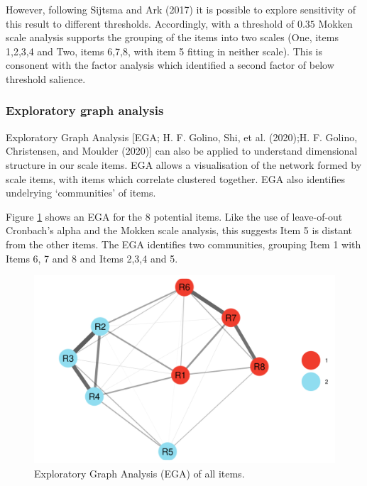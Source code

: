 \documentclass[
  ,jou,floatsintext]{apa6}
\begin{document}
However, following Sijtsma and Ark (2017) it is possible to explore sensitivity of this result to different thresholds. Accordingly, with a threshold of \(0.35\) Mokken scale analysis supports the grouping of the items into two scales (One, items 1,2,3,4 and Two, items 6,7,8, with item 5 fitting in neither scale). This is consonent with the factor analysis which identified a second factor of below threshold salience.

\hypertarget{exploratory-graph-analysis}{%
\subsubsection{Exploratory graph analysis}\label{exploratory-graph-analysis}}

Exploratory Graph Analysis {[}EGA; H. F. Golino, Shi, et al. (2020);H. F. Golino, Christensen, and Moulder (2020){]} can also be applied to understand dimensional structure in our scale items. EGA allows a visualisation of the network formed by scale items, with items which correlate clustered together. EGA also identifies undelrying `communities' of items.

Figure \ref{fig:egafull} shows an EGA for the 8 potential items. Like the use of leave-of-out Cronbach's alpha and the Mokken scale analysis, this suggests Item 5 is distant from the other items. The EGA identifies two communities, grouping Item 1 with Items 6, 7 and 8 and Items 2,3,4 and 5.

\begin{figure}

{\centering \includegraphics[width=1\linewidth]{plots/reason_ega} 

}

\caption{Exploratory Graph Analysis (EGA) of all items.}\label{fig:egafull}
\end{figure}
\end{document}
